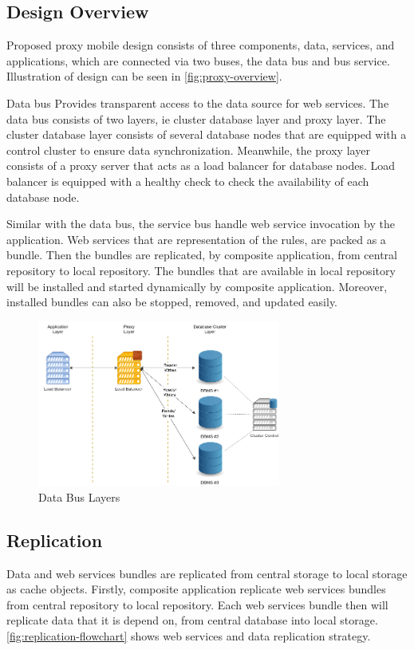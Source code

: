 \documentclass[conference]{IEEEtran}
\begin{document}
\subsection{Design Overview}
Proposed proxy mobile design consists of three components, data, services, and applications, which are connected via two buses, the data bus and bus service. Illustration of design can be seen in \figurename{\ref{fig:proxy-overview}}.

Data bus Provides transparent access to the data source for web services. The data bus consists of two layers, ie cluster database layer and proxy layer. The cluster database layer consists of several database nodes that are equipped with a control cluster to ensure data synchronization. Meanwhile, the proxy layer consists of a proxy server that acts as a load balancer for database nodes. Load balancer is equipped with a healthy check to check the availability of each database node.

Similar with the data bus, the service bus handle web service invocation by the application. Web services that are representation of the rules, are packed as a bundle. Then the bundles are replicated, by composite application, from central repository to local repository. The bundles that are available in local repository will be installed and started dynamically by composite application. Moreover, installed bundles can also be stopped, removed, and updated easily.

\begin{figure}
    \centering
    \includegraphics[width=8cm]{../../Resources/Images/proxy-design-data-layers}
    \caption{Data Bus Layers}
    \label{fig:proxy-design-data-layers}
\end{figure}




\subsection{Replication}
Data and web services bundles are replicated from central storage to local storage as cache objects. Firstly, composite application replicate web services bundles from central repository to local repository. Each web services bundle then will replicate data that it is depend on, from central database into local storage. \figurename{\ref{fig:replication-flowchart}} shows web services and data replication strategy.
\end{document}
